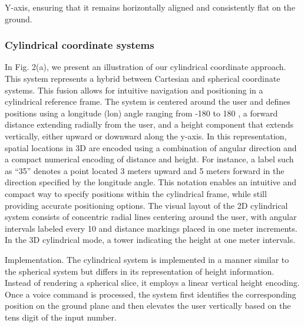 \documentclass[preprint,12pt]{elsarticle}
\newcommand{\reftext}[1]{{\color{gray}#1}}   %
\begin{document}
\reftext{Y-axis, ensuring that it remains horizontally aligned and consistently flat on the ground.}

\subsubsection{Cylindrical coordinate systems}
\reftext{In Fig. 2(a), we present an illustration of our cylindrical coordinate approach. This system represents a hybrid between Cartesian and spherical coordinate systems. This fusion allows for intuitive navigation and positioning in a cylindrical reference frame. The system is centered around the user and defines positions using a longitude (lon) angle ranging from -180 to 180 , a forward distance extending radially from the user, and a height component that extends vertically, either upward or downward along the y-axis. In this representation, spatial locations in 3D are encoded using a combination of angular direction and a compact numerical encoding of distance and height. For instance, a label such as ``35'' denotes a point located 3 meters upward and 5 meters forward in the direction specified by the longitude angle. This notation enables an intuitive and compact way to specify positions within the cylindrical frame, while still providing accurate positioning options. The visual layout of the 2D cylindrical system consists of concentric radial lines centering around the user, with angular intervals labeled every 10 and distance markings placed in one meter increments. In the 3D cylindrical mode, a tower indicating the height at one meter intervals.}

\reftext{Implementation. The cylindrical system is implemented in a manner similar to the spherical system but differs in its representation of height information. Instead of rendering a spherical slice, it employs a linear vertical height encoding. Once a voice command is processed, the system first identifies the corresponding position on the ground plane and then elevates the user vertically based on the tens digit of the input number.}
\end{document}
